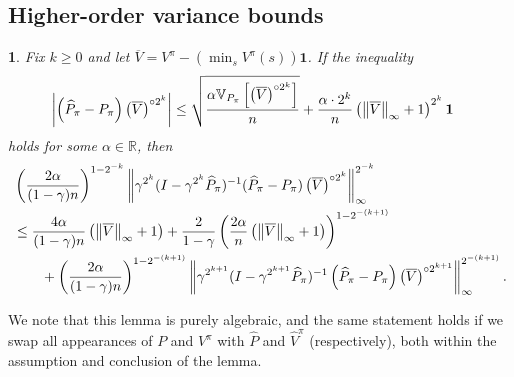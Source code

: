 \documentclass{article}
\theoremstyle{plain}
\theoremstyle{plain}
\newtheorem{lem}[thm]{\protect\lemmaname}
\theoremstyle{remark}
\theoremstyle{plain}
\theoremstyle{plain}
\providecommand{\lemmaname}{Lemma}
\newcommand{\R}{\mathbb{R}}
\newcommand{\Var}{\mathbb{V}}
\newcommand{\Phat}{\widehat{P}}
\newcommand{\Vhat}{\widehat{V}}
\newcommand{\one}{\mathbf{1}}
\newcommand{\Vc}{\overline{V}}
\begin{document}
\subsection{Higher-order variance bounds}
\label{sec:DMDP_high_order_var_bounds}
\begin{lem}
\label{lem:DMDP_recursive_var_param_bound}
    Fix $k \geq 0$ and let $\Vc = V^{\pi} - \left(\min_s V^{\pi}(s)\right)\one$. If the inequality
    \begin{align}
        \left| \left(\Phat_{\pi} - P_{\pi}\right) \left( \Vc \right)^{\circ 2^k} \right|
    &\leq \sqrt{\frac{\alpha   \Var_{P_{\pi}} \left[ \left(\Vc \right)^{\circ 2^k}  \right]    }{n }} + \frac{ \alpha \cdot 2^k }{n}  \left( \infnorm{\Vc} + 1\right)^{2^k}   \one \label{eq:bernstein_like_inequality}
    \end{align}
    holds for some $\alpha \in \R$, then
    \begin{align*}
        &\left(\frac{2\alpha}{(1-\gamma)n}\right)^{1-2^{-k}}\infnorm{ \gamma^{2^k}(I - \gamma^{2^k} \Phat_{\pi})^{-1} (\Phat_{\pi} - P_\pi) \left( \Vc \right)^{\circ 2^k} }^{2^{-k}} \\
       & \leq \frac{4 \alpha}{(1-\gamma)n} \left( \infnorm{\Vc} + 1\right) + \frac{ 2 }{1-\gamma} \left(\frac{2\alpha }{n} \left( \infnorm{\Vc} + 1\right) \right)^{1-2^{-{(k+1)}}} \\
        & \quad \quad + \left(\frac{2\alpha}{(1-\gamma)n}\right)^{1-2^{-(k+1)}} \infnorm{\gamma^{2^{k+1}}(I - \gamma^{2^{k+1}} \Phat_{\pi})^{-1}\left(\Phat_\pi - P_\pi \right) \left(\Vc \right)^{\circ 2^{k+1}}}^{2^{-(k+1)}}.
    \end{align*}
\end{lem}
We note that this lemma is purely algebraic, and the same statement holds if we swap all appearances of $P$ and $V^\pi$ with $\Phat$ and $\Vhat^\pi$ (respectively), both within the assumption and conclusion of the lemma.
\end{document}
